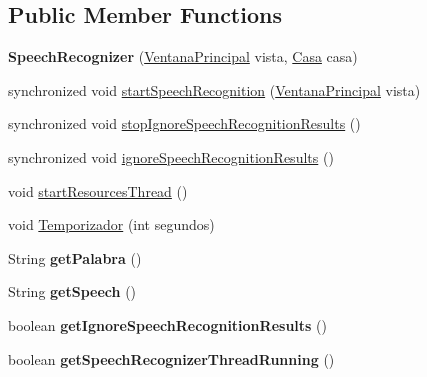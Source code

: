 \subsection*{Public Member Functions}
\begin{DoxyCompactItemize}
\item 
\mbox{\label{classapplication_1_1_speech_recognizer_acf64bba8786b912f367e230d195104b2}} 
{\bfseries Speech\+Recognizer} (\mbox{\hyperlink{classvista_1_1_ventana_principal}{Ventana\+Principal}} vista, \mbox{\hyperlink{classmodelo_1_1_casa}{Casa}} casa)
\item 
synchronized void \mbox{\hyperlink{classapplication_1_1_speech_recognizer_a3c3ad8b38751bf186e470dc9e29bec57}{start\+Speech\+Recognition}} (\mbox{\hyperlink{classvista_1_1_ventana_principal}{Ventana\+Principal}} vista)
\item 
synchronized void \mbox{\hyperlink{classapplication_1_1_speech_recognizer_a6c9ee420dd7fcf9b6aeda63361b0c819}{stop\+Ignore\+Speech\+Recognition\+Results}} ()
\item 
synchronized void \mbox{\hyperlink{classapplication_1_1_speech_recognizer_ad3dee52e0a9cd3dbcd9efa1fa6d38033}{ignore\+Speech\+Recognition\+Results}} ()
\item 
void \mbox{\hyperlink{classapplication_1_1_speech_recognizer_a494e51cb32e7ebc01e58ebc43444c387}{start\+Resources\+Thread}} ()
\item 
void \mbox{\hyperlink{classapplication_1_1_speech_recognizer_a52344e31f4d4cec33c0713387a10c235}{Temporizador}} (int segundos)
\item 
\mbox{\label{classapplication_1_1_speech_recognizer_a36f81c4e2247525167e24f41a6de25f6}} 
String {\bfseries get\+Palabra} ()
\item 
\mbox{\label{classapplication_1_1_speech_recognizer_af426938b9762c29f5a5bfbb3391fe63d}} 
String {\bfseries get\+Speech} ()
\item 
\mbox{\label{classapplication_1_1_speech_recognizer_aa6e25a4037ce514d7d4a6835afbf0db8}} 
boolean {\bfseries get\+Ignore\+Speech\+Recognition\+Results} ()
\item 
\mbox{\label{classapplication_1_1_speech_recognizer_a0fc8931dac55b932ee36e4d537a76063}} 
boolean {\bfseries get\+Speech\+Recognizer\+Thread\+Running} ()
\end{DoxyCompactItemize}


